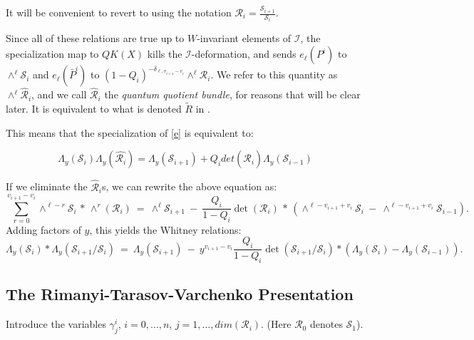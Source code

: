 \documentclass[11pt,letterpaper]{amsart}
\begin{document}
 It will be convenient to revert to using the notation $\mathcal{R}_i=\frac{\mathcal{S}_{i+1}}{\mathcal{S}_i}$.

Since all of these relations are true up to $W$-invariant elements of $\mathcal{I}$, the specialization map to $QK(X)$ kills the $\mathcal{I}$-deformation, and sends $e_\ell(P^i)$ to $\wedge^\ell \mathcal{S}_i$ and $e_\ell(\bar{P}^i)$ to $(1-Q_i)^{-\delta_{\ell,v_{i+1}-v_i}}\wedge^\ell \mathcal{R}_i$. We refer to this quantity as $\wedge^{\ell}\widehat{\mathcal{R}}_i$, and we call $\widehat{\mathcal{R}}_i$ the \emph{quantum quotient bundle}, for reasons that will be clear later. It is equivalent to what is denoted $\tilde{R}$ in \cite{conj}. 

This means that the specialization of \eqref{e} is equivalent to:


\begin{equation}
\label{gamer}
\Lambda_y(\mathcal{S}_i)\Lambda_y(\widehat{\mathcal{R}_i})=\Lambda_y(\mathcal{S}_{i+1})+Q_idet(\widehat{\mathcal{R}_i})\Lambda_y(\mathcal{S}_{i-1})
\end{equation}

If we eliminate the $\widehat{\mathcal{R}}_i$s, we can rewrite the above equation as:
\begin{equation}
\sum_{r=0}^{v_{i+1}-v_i} \wedge^{\ell-r} \mathcal{S}_i \,* \, 
\wedge^r( \mathcal{R}_i) 
\: = \:
\wedge^{\ell} \mathcal{S}_{i+1} \: - \:
\frac{Q_i}{1-Q_i} \det( \mathcal{R}_i) \, * \,
\left( \wedge^{\ell -v_{i+1}+v_i} \mathcal{S}_i \: - \:
\wedge^{\ell -v_{i+1}+v_i} \mathcal{S}_{i-1}\right).
\end{equation}
Adding factors of $y$, this yields the Whitney relations:
\begin{equation}  \label{whitney2}
\Lambda_y(\mathcal{S}_i) * \Lambda_y( \mathcal{S}_{i+1}/\mathcal{S}_i)
\: = \:
\Lambda_y( \mathcal{S}_{i+1}) \: - \:
y^{v_{i+1}-v_i} \frac{Q_i}{1-Q_i} \det(\mathcal{S}_{i+1}/\mathcal{S}_i) *
\left( \Lambda_y(\mathcal{S}_i) - \Lambda_y(\mathcal{S}_{i-1}) \right).
\end{equation}



\subsection{The Rimanyi-Tarasov-Varchenko Presentation}


Introduce the variables $\gamma^i_j$, $i=0,\dots,n$, $j=1,\dots,dim(\mathcal{R}_i)$. (Here $\mathcal{R}_0$ denotes $\mathcal{S}_1$).
\end{document}
